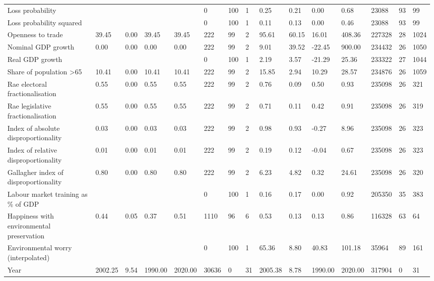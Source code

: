 \begin{longtable}{lllllllllllllll}
Loss probability &  &  &  &  & 0 & 100 & 1 & 0.25 & 0.21 & 0.00 & 0.68 & 23088 & 93 & 99\\
\addlinespace
Loss probability squared &  &  &  &  & 0 & 100 & 1 & 0.11 & 0.13 & 0.00 & 0.46 & 23088 & 93 & 99\\
Openness to trade & 39.45 & 0.00 & 39.45 & 39.45 & 222 & 99 & 2 & 95.61 & 60.15 & 16.01 & 408.36 & 227328 & 28 & 1024\\
Nominal GDP growth & 0.00 & 0.00 & 0.00 & 0.00 & 222 & 99 & 2 & 9.01 & 39.52 & -22.45 & 900.00 & 234432 & 26 & 1050\\
Real GDP growth &  &  &  &  & 0 & 100 & 1 & 2.19 & 3.57 & -21.29 & 25.36 & 233322 & 27 & 1044\\
Share of population >65 & 10.41 & 0.00 & 10.41 & 10.41 & 222 & 99 & 2 & 15.85 & 2.94 & 10.29 & 28.57 & 234876 & 26 & 1059\\
\addlinespace
Rae electoral fractionalisation & 0.55 & 0.00 & 0.55 & 0.55 & 222 & 99 & 2 & 0.76 & 0.09 & 0.50 & 0.93 & 235098 & 26 & 321\\
Rae legislative fractionalisation & 0.55 & 0.00 & 0.55 & 0.55 & 222 & 99 & 2 & 0.71 & 0.11 & 0.42 & 0.91 & 235098 & 26 & 319\\
Index of absolute disproportionality & 0.03 & 0.00 & 0.03 & 0.03 & 222 & 99 & 2 & 0.98 & 0.93 & -0.27 & 8.96 & 235098 & 26 & 323\\
Index of relative disproportionality & 0.01 & 0.00 & 0.01 & 0.01 & 222 & 99 & 2 & 0.19 & 0.12 & -0.04 & 0.67 & 235098 & 26 & 323\\
Gallagher index of disproportionality & 0.80 & 0.00 & 0.80 & 0.80 & 222 & 99 & 2 & 6.23 & 4.82 & 0.32 & 24.61 & 235098 & 26 & 320\\
\addlinespace
Labour market training as \% of GDP &  &  &  &  & 0 & 100 & 1 & 0.16 & 0.17 & 0.00 & 0.92 & 205350 & 35 & 383\\
Happiness with environmental preservation & 0.44 & 0.05 & 0.37 & 0.51 & 1110 & 96 & 6 & 0.53 & 0.13 & 0.13 & 0.86 & 116328 & 63 & 64\\
Environmental worry (interpolated) &  &  &  &  & 0 & 100 & 1 & 65.36 & 8.80 & 40.83 & 101.18 & 35964 & 89 & 161\\
Year & 2002.25 & 9.54 & 1990.00 & 2020.00 & 30636 & 0 & 31 & 2005.38 & 8.78 & 1990.00 & 2020.00 & 317904 & 0 & 31\\
\bottomrule
\end{longtable}
